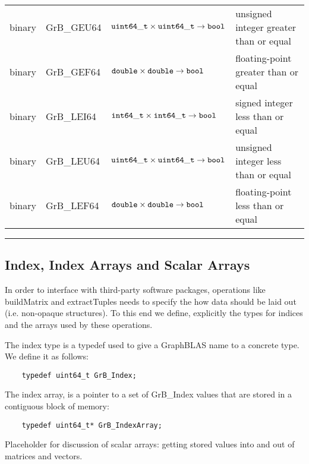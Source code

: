 \begin{table}
\begin{center}
\begin{tabular}{l|l|l|l}
binary		& {\sf GrB\_GEU64}	& ${\tt uint64\_t} \times {\tt uint64\_t} \rightarrow {\tt bool}$ 	& unsigned integer greater than or equal \\
binary		& {\sf GrB\_GEF64}	& ${\tt double} \times {\tt double} \rightarrow {\tt bool}$ 		& floating-point greater than or equal \\
binary		& {\sf GrB\_LEI64}	& ${\tt int64\_t} \times {\tt int64\_t} \rightarrow {\tt bool}$		& signed integer less than or equal \\
binary		& {\sf GrB\_LEU64}	& ${\tt uint64\_t} \times {\tt uint64\_t} \rightarrow {\tt bool}$ 	& unsigned integer less than or equal \\
binary		& {\sf GrB\_LEF64}	& ${\tt double} \times {\tt double} \rightarrow {\tt bool}$ 		& floating-point less than or equal \\
\end{tabular}
\end{center}
\hrule
\end{table}

\subsection{Index, Index Arrays and Scalar Arrays}


In order to interface with third-party software packages, operations like buildMatrix and extractTuples needs to specify the how data should be laid out (i.e. non-opaque structures).  To this end we define, explicitly the types for indices and the arrays used by these operations.

The index type is a typedef used to give a GraphBLAS name to a concrete type. We define it as follows:

\begin{verbatim}
    typedef uint64_t GrB_Index;
\end {verbatim}

The index array, is a pointer to a set of GrB\_Index values that are stored in a contiguous block of memory:

\begin{verbatim}
    typedef uint64_t* GrB_IndexArray;
\end{verbatim}


Placeholder for discussion of scalar arrays: getting stored values into and out of matrices and vectors.  
